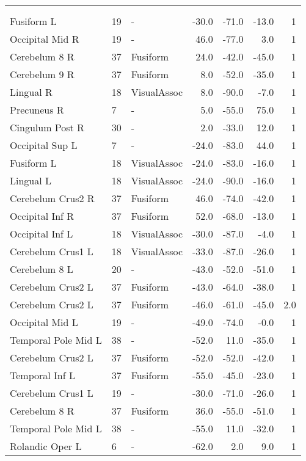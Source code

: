 \begin{table}
    \small
    \centering
    \begin{ThreePartTable}
    \begin{tabularx}{\textwidth}{L l L *{3}{r} *{1}{R}}
     \\
    \toprule
     &  &  &  &  &  & \\
    \toprule
{} \\
\midrule
    Fusiform L & 19 & - & -30.0 & -71.0 & -13.0 & 1 \\
Occipital Mid R & 19 & - & 46.0 & -77.0 & 3.0 & 1 \\
Cerebelum 8 R & 37 & Fusiform & 24.0 & -42.0 & -45.0 & 1 \\
Cerebelum 9 R & 37 & Fusiform & 8.0 & -52.0 & -35.0 & 1 \\
Lingual R & 18 & VisualAssoc & 8.0 & -90.0 & -7.0 & 1 \\
Precuneus R & 7 & - & 5.0 & -55.0 & 75.0 & 1 \\
Cingulum Post R & 30 & - & 2.0 & -33.0 & 12.0 & 1 \\
Occipital Sup L & 7 & - & -24.0 & -83.0 & 44.0 & 1 \\
Fusiform L & 18 & VisualAssoc & -24.0 & -83.0 & -16.0 & 1 \\
Lingual L & 18 & VisualAssoc & -24.0 & -90.0 & -16.0 & 1 \\
Cerebelum Crus2 R & 37 & Fusiform & 46.0 & -74.0 & -42.0 & 1 \\
Occipital Inf R & 37 & Fusiform & 52.0 & -68.0 & -13.0 & 1 \\
Occipital Inf L & 18 & VisualAssoc & -30.0 & -87.0 & -4.0 & 1 \\
Cerebelum Crus1 L & 18 & VisualAssoc & -33.0 & -87.0 & -26.0 & 1 \\
Cerebelum 8 L & 20 & - & -43.0 & -52.0 & -51.0 & 1 \\
Cerebelum Crus2 L & 37 & Fusiform & -43.0 & -64.0 & -38.0 & 1 \\
Cerebelum Crus2 L & 37 & Fusiform & -46.0 & -61.0 & -45.0 & 2.0 \\
Occipital Mid L & 19 & - & -49.0 & -74.0 & -0.0 & 1 \\
Temporal Pole Mid L & 38 & - & -52.0 & 11.0 & -35.0 & 1 \\
Cerebelum Crus2 L & 37 & Fusiform & -52.0 & -52.0 & -42.0 & 1 \\
Temporal Inf L & 37 & Fusiform & -55.0 & -45.0 & -23.0 & 1 \\
Cerebelum Crus1 L & 19 & - & -30.0 & -71.0 & -26.0 & 1 \\
Cerebelum 8 R & 37 & Fusiform & 36.0 & -55.0 & -51.0 & 1 \\
Temporal Pole Mid L & 38 & - & -55.0 & 11.0 & -32.0 & 1 \\
Rolandic Oper L & 6 & - & -62.0 & 2.0 & 9.0 & 1 \\


\end{tabularx}
\end{ThreePartTable}
\end{table}
